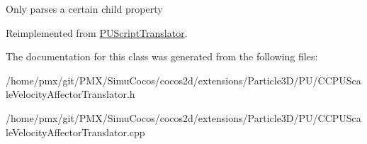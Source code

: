 Only parses a certain child property 

Reimplemented from \hyperlink{classPUScriptTranslator_a0374d83a8a04e57918975d525e0f8fe8}{P\+U\+Script\+Translator}.



The documentation for this class was generated from the following files\+:\begin{DoxyCompactItemize}
\item 
/home/pmx/git/\+P\+M\+X/\+Simu\+Cocos/cocos2d/extensions/\+Particle3\+D/\+P\+U/C\+C\+P\+U\+Scale\+Velocity\+Affector\+Translator.\+h\item 
/home/pmx/git/\+P\+M\+X/\+Simu\+Cocos/cocos2d/extensions/\+Particle3\+D/\+P\+U/C\+C\+P\+U\+Scale\+Velocity\+Affector\+Translator.\+cpp\end{DoxyCompactItemize}
